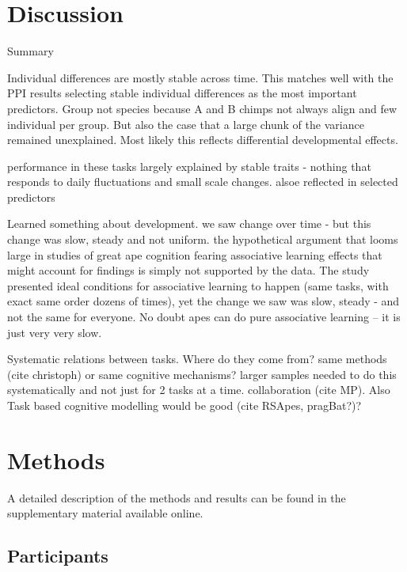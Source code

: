 \documentclass[
  man,floatsintext]{apa6}
\begin{document}
\hypertarget{discussion}{%
\section{Discussion}\label{discussion}}

Summary

Individual differences are mostly stable across time. This matches well with the PPI results selecting stable individual differences as the most important predictors. Group not species because A and B chimps not always align and few individual per group. But also the case that a large chunk of the variance remained unexplained. Most likely this reflects differential developmental effects.

performance in these tasks largely explained by stable traits - nothing that responds to daily fluctuations and small scale changes. alsoe reflected in selected predictors

Learned something about development. we saw change over time - but this change was slow, steady and not uniform. the hypothetical argument that looms large in studies of great ape cognition fearing associative learning effects that might account for findings is simply not supported by the data. The study presented ideal conditions for associative learning to happen (same tasks, with exact same order dozens of times), yet the change we saw was slow, steady - and not the same for everyone. No doubt apes can do pure associative learning -- it is just very very slow.

Systematic relations between tasks. Where do they come from? same methods (cite christoph) or same cognitive mechanisms? larger samples needed to do this systematically and not just for 2 tasks at a time. collaboration (cite MP). Also Task based cognitive modelling would be good (cite RSApes, pragBat?)?

\hypertarget{methods}{%
\section{Methods}\label{methods}}

A detailed description of the methods and results can be found in the supplementary material available online.

\hypertarget{participants}{%
\subsection{Participants}\label{participants}}
\end{document}
